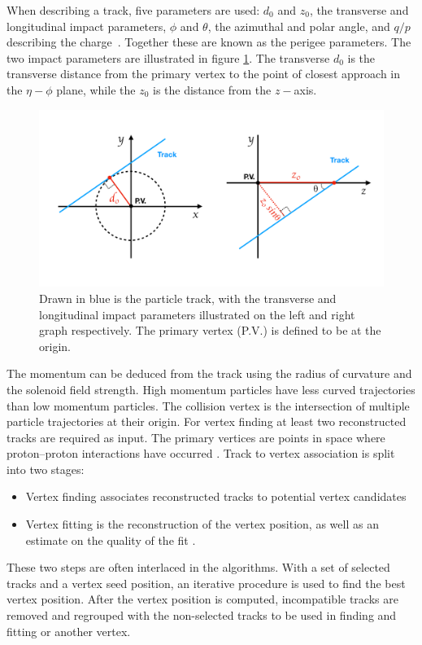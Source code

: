When describing a track, five parameters are used: $d_0$ and $z_0$, the transverse and longitudinal impact parameters, $\phi$ and $\theta$, the azimuthal and polar angle, and $q/p$ describing the charge~\cite{Akesson:973401}. Together these are known as the perigee parameters. The two impact parameters are illustrated in figure \ref{fig:impactparameters}. The transverse $d_0$ is the transverse distance from the primary vertex to the point of closest approach in the $\eta-\phi$ plane, while the $z_0$ is the distance  from the $z-$axis. 
\begin{figure}
    \centering
    \includegraphics[width=\textwidth]{Figures/LHC/impact_params.pdf}
    \caption{Drawn in blue is the particle track, with the transverse and longitudinal impact parameters illustrated on the left and right graph respectively. The primary vertex (P.V.) is defined to be at the origin.}
    \label{fig:impactparameters}
\end{figure}
The momentum can be deduced from the track using the radius of curvature and the solenoid field strength. High momentum particles have less curved trajectories than low momentum particles. The collision vertex is the intersection of multiple particle trajectories at their origin. For vertex finding at least two reconstructed tracks are required as input. The primary vertices are points in space where proton–proton interactions have occurred \cite{ATLAS_primary_vertices}. Track to vertex association is split into two stages: 
\begin{itemize}
    \item Vertex finding associates reconstructed tracks to potential vertex candidates
    \item Vertex fitting is the reconstruction of the vertex position, as well as an estimate on the quality of the fit \cite{Piacquadio_2008}.
\end{itemize}
These two steps are often interlaced in the algorithms. With a set of selected tracks and a vertex seed position, an iterative procedure is used to find the best vertex position. After the vertex position is computed, incompatible tracks are removed and regrouped with the non-selected tracks to be used in finding and fitting or another vertex. 

